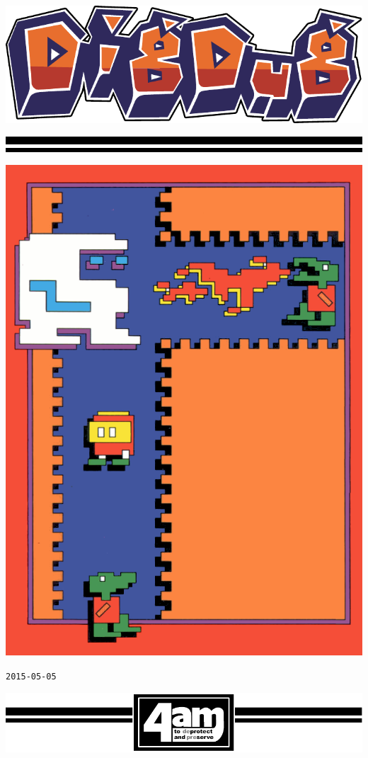 \documentclass{article}
\begin{document}

\vspace*{\fill}

\centerline{\includegraphics[width=.9\textwidth]{logo}}

\vspace*{10pt}

\noindent
\includegraphics[width=\textwidth]{lines}

\vspace*{\fill}

\centerline{\includegraphics[width=.6\textwidth]{cover}}

\vspace*{\fill}

\centerline{\tt 2015-05-05}

\noindent
\includegraphics[width=\textwidth]{footer}
\end{document}
